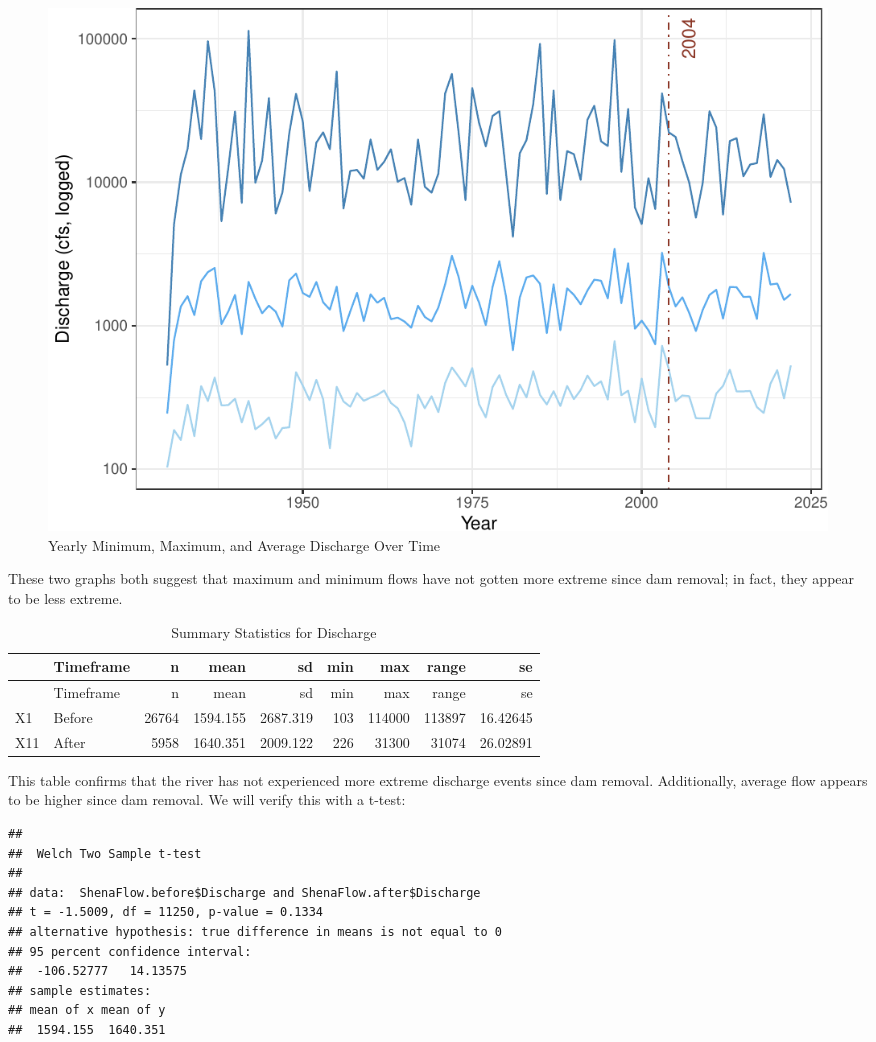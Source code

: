 \documentclass[
  12pt,
]{article}
\begin{document}
\begin{figure}
\centering
\includegraphics{Project_Script_files/figure-latex/Flow.analysis1-1.pdf}
\caption{Yearly Minimum, Maximum, and Average Discharge Over Time}
\end{figure}

These two graphs both suggest that maximum and minimum flows have not
gotten more extreme since dam removal; in fact, they appear to be less
extreme.

\newpage

\begin{longtable}[]{@{}llrrrrrrr@{}}
\caption{Summary Statistics for Discharge}\tabularnewline
\toprule
& Timeframe & n & mean & sd & min & max & range & se \\
\midrule
\endfirsthead
\toprule
& Timeframe & n & mean & sd & min & max & range & se \\
\midrule
\endhead
X1 & Before & 26764 & 1594.155 & 2687.319 & 103 & 114000 & 113897 &
16.42645 \\
X11 & After & 5958 & 1640.351 & 2009.122 & 226 & 31300 & 31074 &
26.02891 \\
\bottomrule
\end{longtable}

This table confirms that the river has not experienced more extreme
discharge events since dam removal. Additionally, average flow appears
to be higher since dam removal. We will verify this with a t-test:

\begin{verbatim}
## 
##  Welch Two Sample t-test
## 
## data:  ShenaFlow.before$Discharge and ShenaFlow.after$Discharge
## t = -1.5009, df = 11250, p-value = 0.1334
## alternative hypothesis: true difference in means is not equal to 0
## 95 percent confidence interval:
##  -106.52777   14.13575
## sample estimates:
## mean of x mean of y 
##  1594.155  1640.351
\end{verbatim}
\end{document}
